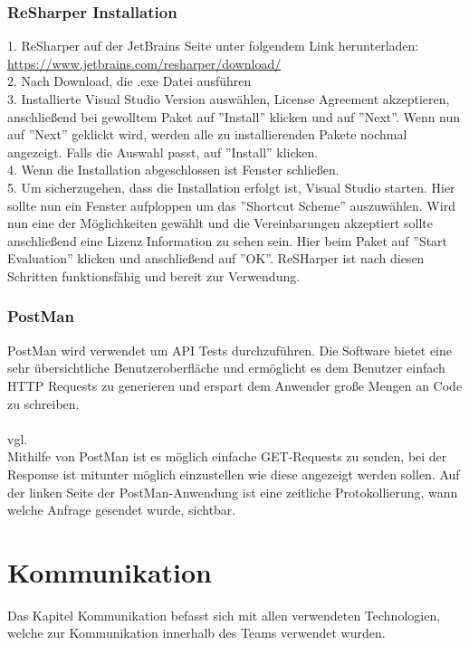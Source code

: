 \subsubsection{ReSharper Installation}
\label{sec:ReSharperInstallation}
1. ReSharper auf der JetBrains Seite unter folgendem Link herunterladen: \break \url {https://www.jetbrains.com/resharper/download/} \\
2. Nach Download, die .exe Datei ausführen \\
3. Installierte Visual Studio Version auswählen, License Agreement akzeptieren, anschließend bei gewolltem Paket auf ''Install'' klicken und auf ''Next''. 
Wenn nun auf ''Next'' geklickt wird, werden alle zu installierenden Pakete nochmal angezeigt. Falls die Auswahl passt, auf ''Install'' klicken. \\
4. Wenn die Installation abgeschlossen ist Fenster schließen. \\
5. Um sicherzugehen, dass die Installation erfolgt ist, Visual Studio starten. Hier sollte nun ein Fenster aufploppen um das ''Shortcut Scheme'' auszuwählen.
Wird nun eine der Möglichkeiten gewählt und die Vereinbarungen akzeptiert sollte anschließend eine Lizenz Information zu sehen sein. Hier beim Paket auf ''Start Evaluation'' klicken und anschließend auf ''OK''. ReSHarper ist nach diesen Schritten funktionsfähig und bereit zur Verwendung.
\subsubsection {PostMan}
\label{sec:PostMan}
PostMan wird verwendet um API Tests durchzuführen. Die Software bietet eine sehr übersichtliche Benutzeroberfläche und ermöglicht es dem Benutzer einfach HTTP Requests zu generieren und erspart dem Anwender große Mengen an Code zu schreiben. \\
\\vgl. \textcite{TechnologiePostman} \\ \break
Mithilfe von PostMan ist es möglich einfache GET-Requests zu senden, bei der Response ist mitunter möglich einzustellen wie diese angezeigt werden sollen. Auf der linken Seite der PostMan-Anwendung ist eine zeitliche Protokollierung, wann welche Anfrage gesendet wurde, sichtbar.
\section{Kommunikation}
\label{sec:Kommunikation}
Das Kapitel Kommunikation befasst sich mit allen verwendeten Technologien, welche zur Kommunikation innerhalb des Teams verwendet wurden.
